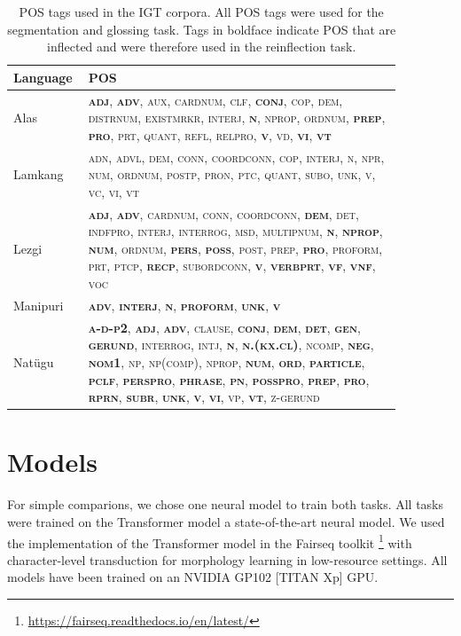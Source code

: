 \begin{table}[h!]
    \centering
    \begin{tabular}{p{0.12\linewidth}p{0.75\linewidth}}
        \textbf{Language} & \textbf{POS} \\
        \hline
        Alas  & \textsc{\textbf{adj}, \textbf{adv}, aux, cardnum, clf, \textbf{conj}, cop, dem, distrnum, existmrkr, interj,
        \textbf{n}, nprop, ordnum, \textbf{prep}, \textbf{pro}, prt, quant, refl, relpro, \textbf{v}, vd, \textbf{vi}, \textbf{vt}} \\
        Lamkang & \textsc{adn, advl, dem, conn, coordconn, cop, interj, n, npr, num, ordnum, postp, pron, ptc, quant, subo, unk, v, vc, vi, vt} \\
        Lezgi & \textsc{\textbf{adj}, \textbf{adv}, cardnum, conn, coordconn, \textbf{dem}, det, indfpro, interj, interrog, msd, multipnum, \textbf{n}, \textbf{nprop}, \textbf{num}, ordnum, \textbf{pers}, \textbf{poss}, post, prep, \textbf{pro}, proform, prt, ptcp, \textbf{recp}, subordconn, \textbf{v}, \textbf{verbprt}, \textbf{vf}, \textbf{vnf}, voc} \\
        Manipuri & \textsc{\textbf{adv}, \textbf{interj}, \textbf{n}, \textbf{proform}, \textbf{unk}, \textbf{v}} \\
        Natügu & \textsc{\textbf{a-d-p2}, \textbf{adj}, \textbf{adv}, clause, \textbf{conj}, \textbf{dem}, \textbf{det}, \textbf{gen}, \textbf{gerund}, interrog, intj, \textbf{n}, \textbf{n.(kx.cl)}, ncomp, \textbf{neg}, \textbf{nom1}, np, np(comp), nprop, \textbf{num}, \textbf{ord}, \textbf{particle}, \textbf{pclf}, \textbf{perspro}, \textbf{phrase}, \textbf{pn}, \textbf{posspro}, \textbf{prep}, \textbf{pro}, \textbf{rprn}, \textbf{subr}, \textbf{unk}, \textbf{v}, \textbf{vi}, vp, \textbf{vt}, z-gerund} \\
    \end{tabular}
    \caption{POS tags used in the IGT corpora. All POS tags were used for the segmentation and glossing task. Tags in boldface indicate POS that are inflected and were therefore used in the reinflection task.}
    \label{tab:IGTPOSdata}
\end{table}


\section{Models}
\label{sec:models}

For simple comparions, we chose one neural model to train both tasks. All tasks were trained on the Transformer model \citep{vaswani_attention_2017} a state-of-the-art neural model. We used the implementation of the Transformer model in the Fairseq toolkit \cite{ott_fairseq_2019}\footnote{\url{https://fairseq.readthedocs.io/en/latest/}} with character-level transduction \citep{wu_applying_2020} for morphology learning in low-resource settings. All models have been trained on an NVIDIA GP102 [TITAN Xp] GPU.


